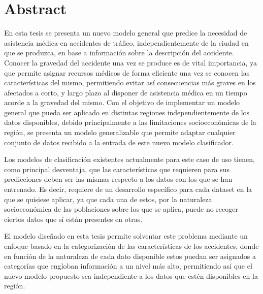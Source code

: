 \chapter*{Abstract}






En esta tesis se presenta un nuevo modelo general que predice la necesidad de asistencia médica en accidentes de tráfico, independientemente de la ciudad en que se produzca, en base a información sobre la descripción del accidente. Conocer la gravedad del accidente una vez se produce es de vital importancia, ya que permite asignar recursos médicos de forma eficiente una vez se conocen las características del mismo, permitiendo evitar así consecuencias más graves en los afectados a corto, y largo plazo al disponer de asistencia médica en un tiempo acorde a la gravedad del mismo. Con el objetivo de implementar un modelo general que pueda ser aplicado en distintas regiones independientemente de los datos disponibles, debido principalmente a las limitaciones socioeconómicas de la región, se presenta un modelo generalizable que permite adaptar cualquier conjunto de datos recibido a la entrada de este nuevo modelo clasificador.

Los modelos de clasificación existentes actualmente para este caso de uso tienen, como principal desventaja, que las características que requieren para sus predicciones deben ser las mismas respecto a los datos con los que se han entrenado. Es decir, requiere de un desarrollo específico para cada dataset en la que se quisiese aplicar, ya que cada una de estos, por la naturaleza socioeconómica de las poblaciones sobre los que se aplica, puede no recoger ciertos datos que sí están presentes en otras. 

El modelo diseñado en esta tesis permite solventar este problema mediante un enfoque basado en la categorización de las características de los accidentes, donde en función de la naturaleza de cada dato disponible estos puedan ser asignados a categorías que engloban información a un nivel más alto, permitiendo así que el nuevo modelo propuesto sea independiente a los datos que estén disponibles en la región.

